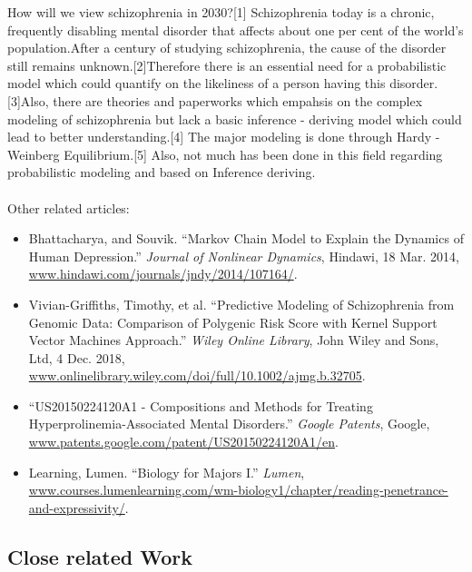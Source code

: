 \documentclass{article}
\begin{document}
How will we view schizophrenia in 2030?[1] Schizophrenia today is a chronic, frequently disabling mental disorder that affects about one per cent of the world’s population.After a century of studying schizophrenia, the cause of the disorder still remains unknown.[2]Therefore there is an essential need for a probabilistic model which could quantify on the likeliness of a person having this disorder.[3]Also, there are theories and paperworks which empahsis on the complex modeling of schizophrenia but lack a basic inference - deriving model which could lead to better understanding.[4] The major modeling is done through Hardy - Weinberg Equilibrium.[5] Also, not much has been done in this field regarding probabilistic modeling and based on Inference deriving. \\ \\
Other related articles:
\begin{itemize}
    \item Bhattacharya, and Souvik. “Markov Chain Model to Explain the Dynamics of Human Depression.” \emph{Journal of Nonlinear Dynamics}, Hindawi, 18 Mar. 2014,\\ \url{www.hindawi.com/journals/jndy/2014/107164/}.
    \item Vivian-Griffiths, Timothy, et al. “Predictive Modeling of Schizophrenia from Genomic Data: Comparison of Polygenic Risk Score with Kernel Support Vector Machines Approach.” \emph{Wiley Online Library}, John Wiley and Sons, Ltd, 4 Dec. 2018, \url{www.onlinelibrary.wiley.com/doi/full/10.1002/ajmg.b.32705}.
    \item “US20150224120A1 - Compositions and Methods for Treating Hyperprolinemia-Associated Mental Disorders.” \emph{Google Patents}, Google,\\ \url{www.patents.google.com/patent/US20150224120A1/en}.
    \item Learning, Lumen. “Biology for Majors I.” \emph{Lumen}, \\ \url{www.courses.lumenlearning.com/wm-biology1/chapter/reading-penetrance-and-expressivity/}.
\end{itemize}

\newpage

\large
\subsection{Close related Work}
\end{document}
